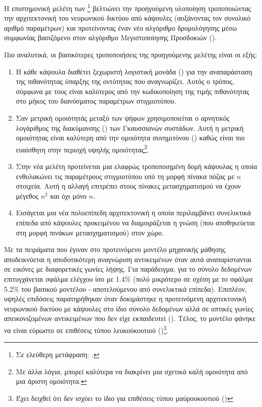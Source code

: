 Η επιστημονική μελέτη των \footnote{Σε ελεύθερη μετάφραση: .}\cite{hinton2018matrix} βελτιώνει την προηγούμενη υλοποίηση τροποποιώντας την αρχιτεκτονική του νευρωνικού δικτύου από κάψουλες (αυξάνοντας τον συνολικό αριθμό παραμέτρων) και προτείνοντας έναν νέο αλγόριθμο δρομολόγησης μέσω συμφωνίας βασιζόμενο στον αλγόριθμο Μεγιστοποίησης Προσδοκιών (). \par

Πιο αναλυτικά, οι βασικότερες τροποποιήσεις της προηγούμενης μελέτης είναι οι εξής:
\begin{enumerate}
    \item Η κάθε κάψουλα διαθέτει ξεχωριστή λογιστική μονάδα () για την αναπαράσταση της πιθανότητας ύπαρξης της οντότητας που αναγνωρίζει. Αυτός ο τρόπος, σύμφωνα με τους \cite{hinton2018matrix} είναι καλύτερος από την κωδικοποίηση της τιμής πιθανότητας στο μήκος του διανύσματος παραμέτρων στιγμιοτύπου.
    \item Σαν μετρική ομοιότητάς μεταξύ των ψήφων χρησιμοποιείται ο αρνητικός λογάριθμος της διακύμανσης () των Γκαυσσιανών συστάδων. Αυτή η μετρική ομοιότητας είναι καλύτερη από την ομοιότητα συνημιτόνου () καθώς είναι πιο ευαίσθητη στην περιοχή υψηλής ομοιότητας\footnote{Με άλλα λόγια, μπορεί καλύτερα να διακρίνει μια σχετικά καλή ομοιότητα από μια άριστη ομοιότητα.}.
    \item Στην νέα μελέτη προτείνεται μια ελαφρώς τροποποιημένη δομή κάψουλας η οποία ενθυλακώνει τις παραμέτρους στιγμιοτύπου υπό τη μορφή πίνακα πόζας με $n$ στοιχεία. Αυτή η αλλαγή επιτρέπει στους πίνακες μετασχηματισμού να έχουν μέγεθος $n^2$ και όχι μόνο $n$.
    \item Εισάγεται μια νέα πολυεπίπεδη αρχιτεκτονική η οποία περιλαμβάνει συνελικτικά επίπεδα από κάψουλες προκειμένου να διαμοιράζεται η γνώση (που αποθηκεύεται στη μορφή πινάκων μετασχηματισμού) στον χώρο.
\end{enumerate}\par

Με τα πειράματα που έγιναν στο προτεινόμενο μοντέλο μηχανικής μάθησης αποδεικνύεται η αποδοτικότερη αναγνώριση αντικειμένων όταν αυτά αναπαρίστανται σε εικόνες με διαφορετικές γωνίες λήψης. Για παράδειγμα, για το σύνολο δεδομένων  επιτυγχάνεται σφάλμα ελέγχου ίσο με 1.4\% (πολύ μικρότερο σε σχέση με το σφάλμα 5.2\% του βασικού μοντέλου - αποτελούμενου από συνελικτικά επίπεδα). Επιπλέον, υψηλές επιδόσεις παρατηρήθηκαν όταν δοκιμάστηκε η προτεινόμενη αρχιτεκτονική νευρωνικού δικτύου με κάψουλες στο ίδιο σύνολο δεδομένων αλλά σε οπτικές γωνίες απεικονιζομένων αντικειμένων που δεν είχε εκπαιδευτεί (). Τέλος, το μοντέλο φάνηκε να είναι εύρωστο σε επιθέσεις τύπου λευκού\textendash κουτιού ()\cite{goodfellow2014explaining}\footnote{Έχει δειχθεί ότι δεν ισχύει το ίδιο για επιθέσεις τύπου μαύρου\textendash κουτιού ()}. 

